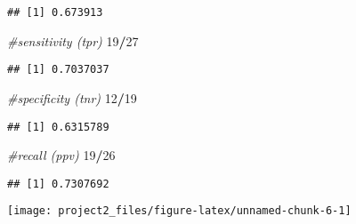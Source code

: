 \documentclass[]{article}
\newenvironment{Shaded}{\begin{snugshade}}{\end{snugshade}}
\newcommand{\CommentTok}[1]{\textcolor[rgb]{0.56,0.35,0.01}{\textit{#1}}}
\newcommand{\DataTypeTok}[1]{\textcolor[rgb]{0.13,0.29,0.53}{#1}}
\newcommand{\DecValTok}[1]{\textcolor[rgb]{0.00,0.00,0.81}{#1}}
\newcommand{\KeywordTok}[1]{\textcolor[rgb]{0.13,0.29,0.53}{\textbf{#1}}}
\newcommand{\NormalTok}[1]{#1}
\newcommand{\OperatorTok}[1]{\textcolor[rgb]{0.81,0.36,0.00}{\textbf{#1}}}
\newcommand{\StringTok}[1]{\textcolor[rgb]{0.31,0.60,0.02}{#1}}
\begin{document}
\begin{verbatim}
## [1] 0.673913
\end{verbatim}

\begin{Shaded}
\begin{Highlighting}[]
\CommentTok{#sensitivity (tpr) }
\DecValTok{19}\OperatorTok{/}\DecValTok{27}
\end{Highlighting}
\end{Shaded}

\begin{verbatim}
## [1] 0.7037037
\end{verbatim}

\begin{Shaded}
\begin{Highlighting}[]
\CommentTok{#specificity (tnr) }
\DecValTok{12}\OperatorTok{/}\DecValTok{19}
\end{Highlighting}
\end{Shaded}

\begin{verbatim}
## [1] 0.6315789
\end{verbatim}

\begin{Shaded}
\begin{Highlighting}[]
\CommentTok{#recall (ppv)}
\DecValTok{19}\OperatorTok{/}\DecValTok{26}
\end{Highlighting}
\end{Shaded}

\begin{verbatim}
## [1] 0.7307692
\end{verbatim}

\begin{Shaded}
\end{Shaded}

\begin{center}\texttt{[image: project2\_files/figure-latex/unnamed-chunk-6-1]} \end{center}
\end{document}
